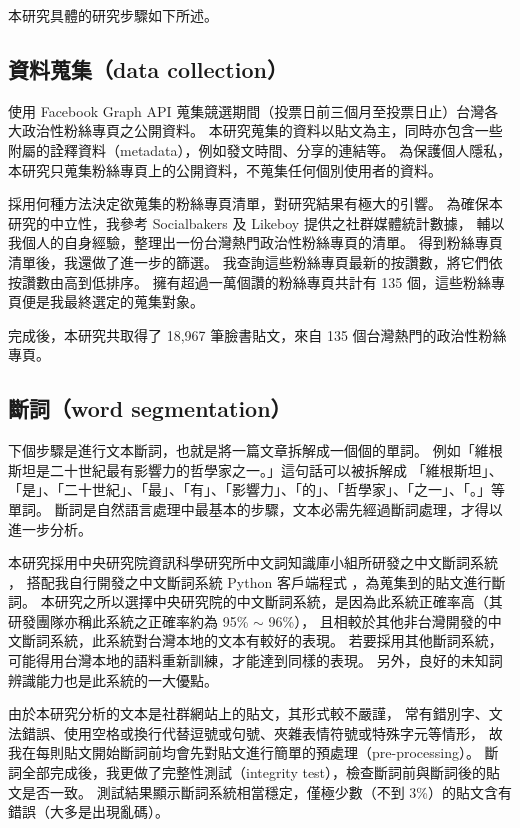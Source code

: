 \documentclass[letterpaper, 10pt, conference]{ieeeconf}   %
\begin{document}
\begin{CJK}{UTF8}{bsmi}
本研究具體的研究步驟如下所述。%

\subsection*{資料蒐集（data collection）}

使用 Facebook Graph API 蒐集競選期間（投票日前三個月至投票日止）台灣各大政治性粉絲專頁之公開資料。%
本研究蒐集的資料以貼文為主，同時亦包含一些附屬的詮釋資料（metadata），例如發文時間、分享的連結等。%
為保護個人隱私，本研究只蒐集粉絲專頁上的公開資料，不蒐集任何個別使用者的資料。%

採用何種方法決定欲蒐集的粉絲專頁清單，對研究結果有極大的引響。%
為確保本研究的中立性，我參考 Socialbakers \cite{c4} 及 Likeboy \cite{c5} 提供之社群媒體統計數據，%
輔以我個人的自身經驗，整理出一份台灣熱門政治性粉絲專頁的清單。%
得到粉絲專頁清單後，我還做了進一步的篩選。%
我查詢這些粉絲專頁最新的按讚數，將它們依按讚數由高到低排序。%
擁有超過一萬個讚的粉絲專頁共計有 135 個，這些粉絲專頁便是我最終選定的蒐集對象。%

完成後，本研究共取得了 18,967 筆臉書貼文，來自 135 個台灣熱門的政治性粉絲專頁。%

\subsection*{斷詞（word segmentation）}

下個步驟是進行文本斷詞，也就是將一篇文章拆解成一個個的單詞。%
例如「維根斯坦是二十世紀最有影響力的哲學家之一。」這句話可以被拆解成%
「維根斯坦」、「是」、「二十世紀」、「最」、「有」、「影響力」、「的」、「哲學家」、「之一」、「。」等單詞。%
斷詞是自然語言處理中最基本的步驟，文本必需先經過斷詞處理，才得以進一步分析。%

本研究採用中央研究院資訊科學研究所中文詞知識庫小組所研發之中文斷詞系統 \cite{c6}，%
搭配我自行開發之中文斷詞系統 Python 客戶端程式 \cite{c7}，為蒐集到的貼文進行斷詞。%
本研究之所以選擇中央研究院的中文斷詞系統，是因為此系統正確率高（其研發團隊亦稱此系統之正確率約為 95\% $\sim$ 96\%），%
且相較於其他非台灣開發的中文斷詞系統，此系統對台灣本地的文本有較好的表現。%
若要採用其他斷詞系統，可能得用台灣本地的語料重新訓練，才能達到同樣的表現。%
另外，良好的未知詞辨識能力也是此系統的一大優點。%

由於本研究分析的文本是社群網站上的貼文，其形式較不嚴謹，%
常有錯別字、文法錯誤、使用空格或換行代替逗號或句號、夾雜表情符號或特殊字元等情形，%
故我在每則貼文開始斷詞前均會先對貼文進行簡單的預處理（pre-processing）。%
斷詞全部完成後，我更做了完整性測試（integrity test），檢查斷詞前與斷詞後的貼文是否一致。%
測試結果顯示斷詞系統相當穩定，僅極少數（不到 3\%）的貼文含有錯誤（大多是出現亂碼）。%


\end{CJK}
\end{document}
